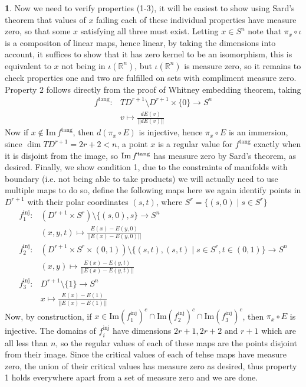 \documentclass[10.5pt]{article}
\theoremstyle{definition}
\newtheorem{pb}{}
\newcommand{\set}[1]{\{#1\}}
\newcommand{\norm}[1]{\lvert\lvert#1\rvert\rvert}
\newcommand{\tand}{\text{ and }}
\begin{document}
\begin{pb}
        Now we need to verify properties (1-3), it will be easiest to show using Sard's theorem that values of \(x\) failing each of these individual properties have measure zero, so that some \(x\) satisfying all three must exist. Letting \(x \in S^n\) note that \(\pi_x\circ \iota\) is a compositon of linear maps, hence linear, by taking the dimensions into account, it suffices to show that it has zero kernel to be an isomorphism, this is equivalent to \(x\) not being in \(\iota(\mathbb{R}^n)\), but \(\iota(\mathbb{R}^n)\) is measure zero, so it remains to check properties one and two are fulfilled on sets with compliment measure zero. Property \(2\) follows directly from the proof of Whitney embedding theorem, taking \begin{align*}
            f^{\text{tang}} : &TD^{r+1} \setminus D^{r+1} \times \set{0} \to S^n \\
            &v \mapsto \frac{dE(v)}{\norm{dE(v)}}
        \end{align*}
        Now if \(x \not \in \text{Im}\,f^{\text{tang}}\), then \(d(\pi_x\circ E)\) is injective, hence \(\pi_x \circ E\) is an immersion, since \(\dim TD^{r+1} = 2r+2 < n\), a point \(x\) is a regular value for \(f^{\text{tang}}\) exactly when it is disjoint from the image, so \(\text{Im}\,f^\text{\text{tang}}\) has measure zero by Sard's theorem, as desired. Finally, we show condition 1, due to the constraints of manifolds with boundary (i.e. not being able to take products) we will actually need to use multiple maps to do so, define the following maps here we again identify points in \(D^{r+1}\) with their polar coordinates \((s,t)\), where \(S^r = \set{(s,0) \mid s \in S^r}\)
        \begin{align*}
            f^\text{inj}_1: &(D^{r+1} \times S^r) \setminus \set{(s,0),s} \to S^n  \\
            &(x,y,t) \mapsto \frac{E(x) - E(y,0)}{\norm{E(x) - E(y,0)}} \\
            f^{\text{inj}}_2: &(D^{r+1} \times S^r \times (0,1)) \setminus \set{(s,t),(s,t) \mid s \in S^r, t\in (0,1)} \to S^n  \\
            &(x,y) \mapsto \frac{E(x) - E(y,t)}{\norm{E(x) - E(y,t)}}\\
            f^\text{inj}_3: &D^{r+1} \setminus \set{1} \to S^n  \\
            &x \mapsto \frac{E(x) - E(1)}{\norm{E(x) - E(1)}}
        \end{align*}
        Now, by construction, if \(x \in \text{Im}(f_1^\text{inj})^c \cap \text{Im}(f_2^\text{inj})^c \cap \text{Im}(f_3^\text{inj})^c\), then \(\pi_x\circ E\) is injective. The domains of \(f_i^\text{inj}\) have dimensions \(2r+1,2r+2 \tand r+1\) which are all less than \(n\), so the regular values of each of these maps are the points disjoint from their image. Since the critical values of each of tehse maps have measure zero, the union of their critical values has measure zero as desired, thus property 1 holds everywhere apart from a set of measure zero and we are done.
    \end{pb}
\end{document}
